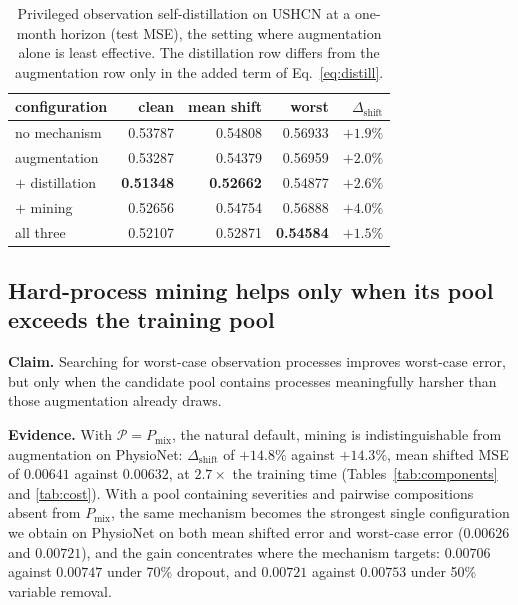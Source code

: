 \begin{table}[t]
\caption{Privileged observation self-distillation on USHCN at a one-month horizon (test MSE\prelim), the setting
where augmentation alone is least effective. The distillation row differs from the augmentation row only in the
added term of Eq.~\ref{eq:distill}.}
\label{tab:posd}
\small
\begin{tabular}{lrrrr}
\toprule
configuration & clean & mean shift & worst & $\Delta_{\mathrm{shift}}$ \\
\midrule
no mechanism & 0.53787 & 0.54808 & 0.56933 & $+1.9\%$ \\
augmentation & 0.53287 & 0.54379 & 0.56959 & $+2.0\%$ \\
\quad $+$ distillation & \textbf{0.51348} & \textbf{0.52662} & 0.54877 & $+2.6\%$ \\
\quad $+$ mining & 0.52656 & 0.54754 & 0.56888 & $+4.0\%$ \\
all three & 0.52107 & 0.52871 & \textbf{0.54584} & $\mathbf{+1.5\%}$ \\
\bottomrule
\end{tabular}
\end{table}

\subsection{Hard-process mining helps only when its pool exceeds the training pool}
\label{sec:mining-results}

\textbf{Claim.} Searching for worst-case observation processes improves worst-case error, but only when the
candidate pool contains processes meaningfully harsher than those augmentation already draws.

\textbf{Evidence.} With $\mathcal{P}=P_{\mathrm{mix}}$, the natural default, mining is indistinguishable from
augmentation on PhysioNet: $\Delta_{\mathrm{shift}}$ of $+14.8\%$ against $+14.3\%$, mean shifted MSE of
$0.00641$ against $0.00632$, at $2.7\times$ the training time (Tables~\ref{tab:components} and \ref{tab:cost}).
With a pool containing severities and pairwise compositions absent from $P_{\mathrm{mix}}$, the same mechanism
becomes the strongest single configuration we obtain on PhysioNet on both mean shifted error and worst-case error
($0.00626$ and $0.00721$), and the gain concentrates where the mechanism targets: $0.00706$ against $0.00747$
under 70\% dropout, and $0.00721$ against $0.00753$ under 50\% variable removal.

